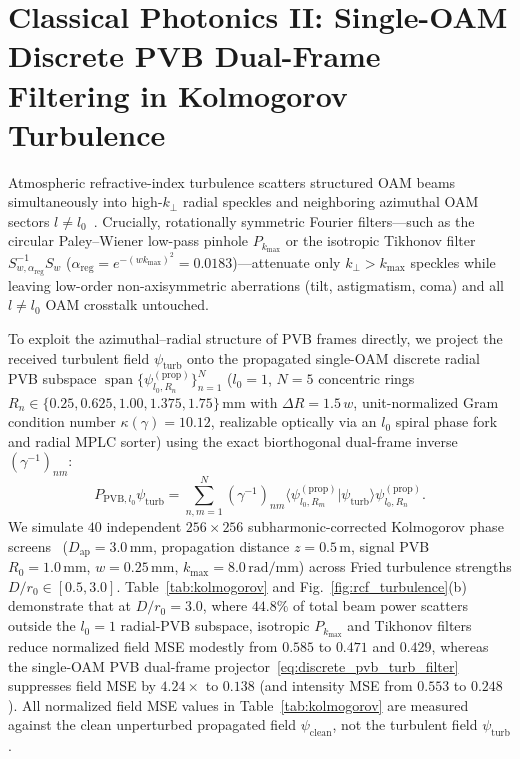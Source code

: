 \documentclass[aps,pra,reprint,nofootinbib,floatfix,longbibliography]{revtex4-2}
\newcommand{\braket}[2]{\langle #1 | #2 \rangle}
\begin{document}
\section{Classical Photonics II: Single-OAM Discrete PVB Dual-Frame Filtering in Kolmogorov Turbulence}
\label{sec:turbulence}

Atmospheric refractive-index turbulence scatters structured OAM beams simultaneously into high-$k_\perp$ radial speckles and neighboring azimuthal OAM sectors $l \neq l_0$~\cite{Paterson2005,TylerBoyd2009,AndrewsPhillips2005}. Crucially, rotationally symmetric Fourier filters---such as the circular Paley--Wiener low-pass pinhole $P_{k_{\max}}$ or the isotropic Tikhonov filter $S_{w,\alpha_{\mathrm{reg}}}^{-1}S_w$ ($\alpha_{\mathrm{reg}} = e^{-(w k_{\max})^2} = 0.0183$)---attenuate only $k_\perp > k_{\max}$ speckles while leaving low-order non-axisymmetric aberrations (tilt, astigmatism, coma) and all $l \neq l_0$ OAM crosstalk untouched.

To exploit the azimuthal--radial structure of PVB frames directly, we project the received turbulent field $\psi_{\mathrm{turb}}$ onto the propagated single-OAM discrete radial PVB subspace $\operatorname{span}\{\psi_{l_0,R_n}^{(\mathrm{prop})}\}_{n=1}^N$ ($l_0 = 1$, $N = 5$ concentric rings $R_n \in \{0.25, 0.625, 1.00, 1.375, 1.75\}\,\mathrm{mm}$ with $\Delta R = 1.5\,w$, unit-normalized Gram condition number $\kappa(\gamma) = 10.12$, realizable optically via an $l_0$ spiral phase fork and radial MPLC sorter) using the exact biorthogonal dual-frame inverse $(\gamma^{-1})_{nm}$:
\begin{equation}
P_{\mathrm{PVB},l_0}\psi_{\mathrm{turb}} = \sum_{n,m=1}^N (\gamma^{-1})_{nm}\braket{\psi_{l_0,R_m}^{(\mathrm{prop})}}{\psi_{\mathrm{turb}}}\psi_{l_0,R_n}^{(\mathrm{prop})}.
\label{eq:discrete_pvb_turb_filter}
\end{equation}
We simulate $40$ independent $256\times 256$ subharmonic-corrected Kolmogorov phase screens~\cite{Lane1992} ($D_{\mathrm{ap}} = 3.0\,\mathrm{mm}$, propagation distance $z = 0.5\,\mathrm{m}$, signal PVB $R_0 = 1.0\,\mathrm{mm}$, $w = 0.25\,\mathrm{mm}$, $k_{\max} = 8.0\,\mathrm{rad/mm}$) across Fried turbulence strengths $D/r_0 \in [0.5, 3.0]$. Table~\ref{tab:kolmogorov} and Fig.~\ref{fig:rcf_turbulence}(b) demonstrate that at $D/r_0 = 3.0$, where $44.8\%$ of total beam power scatters outside the $l_0 = 1$ radial-PVB subspace, isotropic $P_{k_{\max}}$ and Tikhonov filters reduce normalized field MSE modestly from $0.585$ to $0.471$ and $0.429$, whereas the single-OAM PVB dual-frame projector~\eqref{eq:discrete_pvb_turb_filter} suppresses field MSE by $4.24\times$ to $0.138$ (and intensity MSE from $0.553$ to $0.248$). All normalized field MSE values in Table~\ref{tab:kolmogorov} are measured against the clean unperturbed propagated field $\psi_{\mathrm{clean}}$, not the turbulent field $\psi_{\mathrm{turb}}$.
\end{document}

